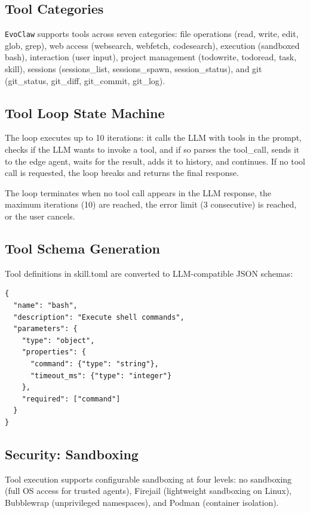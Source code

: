 \documentclass[conference]{IEEEtran}
\newcommand{\evoclaw}{\texttt{EvoClaw}\xspace}
\begin{document}
\subsection{Tool Categories}

\evoclaw{} supports tools across seven categories: file operations (read, write, edit, glob, grep), web access (websearch, webfetch, codesearch), execution (sandboxed bash), interaction (user input), project management (todowrite, todoread, task, skill), sessions (sessions\_list, sessions\_spawn, session\_status), and git (git\_status, git\_diff, git\_commit, git\_log).

\subsection{Tool Loop State Machine}

The loop executes up to 10 iterations: it calls the LLM with tools in the prompt, checks if the LLM wants to invoke a tool, and if so parses the tool\_call, sends it to the edge agent, waits for the result, adds it to history, and continues. If no tool call is requested, the loop breaks and returns the final response.

The loop terminates when no tool call appears in the LLM response, the maximum iterations (10) are reached, the error limit (3 consecutive) is reached, or the user cancels.

\subsection{Tool Schema Generation}

Tool definitions in skill.toml are converted to LLM-compatible JSON schemas:

\begin{lstlisting}[style=jsoncode]
{
  "name": "bash",
  "description": "Execute shell commands",
  "parameters": {
    "type": "object",
    "properties": {
      "command": {"type": "string"},
      "timeout_ms": {"type": "integer"}
    },
    "required": ["command"]
  }
}
\end{lstlisting}

\subsection{Security: Sandboxing}

Tool execution supports configurable sandboxing at four levels: no sandboxing (full OS access for trusted agents), Firejail (lightweight sandboxing on Linux), Bubblewrap (unprivileged namespaces), and Podman (container isolation).
\end{document}
